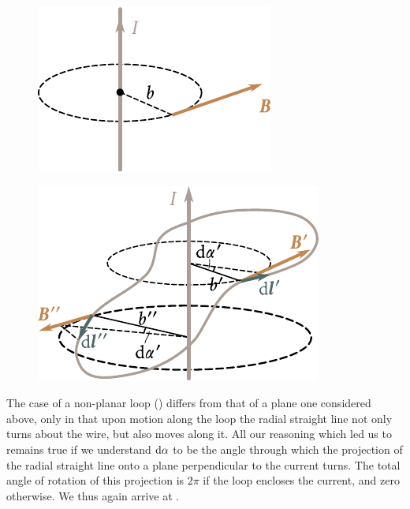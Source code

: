\begin{figure}[t]
	\begin{minipage}[t]{0.41\linewidth}
		\begin{center}
			\includegraphics[scale=1]{figures/ch_06/fig_6_25.pdf}
			\caption[]{}
			\label{fig:6_25}
		\end{center}
	\end{minipage}
	\hfill{ }%
	\begin{minipage}[t]{0.55\linewidth}
		\begin{center}
			\includegraphics[scale=1]{figures/ch_06/fig_6_26.pdf}
			\caption[]{}
			\label{fig:6_26}
		\end{center}
	\end{minipage}
\vspace{-0.4cm}
\end{figure}

The case of a non-planar loop () differs from that of a plane one considered above, only in that upon motion along the loop the radial straight line not only turns about the wire, but also moves along it. All our reasoning which led us to  remains true if we understand $\mathrm{d}\alpha$ to be the angle through which the projection of the radial straight line onto a plane perpendicular to the current turns. The total angle of rotation of this projection is $2\pi$ if the loop encloses the current, and zero otherwise. We thus again arrive at .


